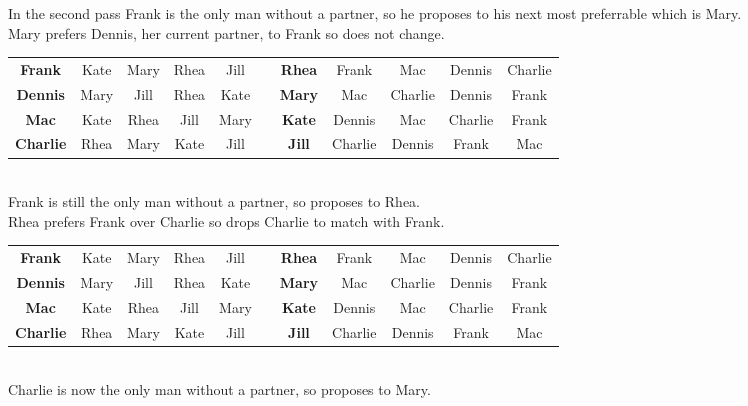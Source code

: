 \documentclass[11pt,a4paper]{article}
\begin{document}
In the second pass Frank is the only man without a partner, so he proposes to his next most preferrable which is Mary.\\
Mary prefers Dennis, her current partner, to Frank so does not change.\\
\begin{tabular}{|c|cccc|c|c|cccc|}
  \cline{1-5} \cline{7-11}
  \textbf{Frank} & \cellcolor{red!25}Kate & \cellcolor{red!25}Mary & Rhea & Jill & \quad &\textbf{Rhea} & Frank & Mac & Dennis & \cellcolor{green!25} Charlie\\
  \textbf{Dennis} & \cellcolor{green!25} Mary & Jill & Rhea & Kate & \quad & \textbf{Mary} & Mac & Charlie & \cellcolor{green!25} Dennis & \cellcolor{red!25}Frank\\
  \textbf{Mac} & \cellcolor{green!25} Kate & Rhea & Jill & Mary & \quad & \textbf{Kate} & Dennis & \cellcolor{green!25} Mac & Charlie & \cellcolor{red!25} Frank\\
  \textbf{Charlie} & \cellcolor{green!25} Rhea & Mary & Kate & Jill & \quad & \textbf{Jill} & Charlie & Dennis & Frank & Mac\\
  \cline{1-5} \cline{7-11}
\end{tabular}\\
Frank is still the only man without a partner, so proposes to Rhea.\\
Rhea prefers Frank over Charlie so drops Charlie to match with Frank.\\
\begin{tabular}{|c|cccc|c|c|cccc|}
  \cline{1-5} \cline{7-11}
  \textbf{Frank} & \cellcolor{red!25}Kate & \cellcolor{red!25}Mary & \cellcolor{green!25}Rhea & Jill & \quad &\textbf{Rhea} & \cellcolor{green!25}Frank & Mac & Dennis & \cellcolor{red!25} Charlie\\
  \textbf{Dennis} & \cellcolor{green!25} Mary & Jill & Rhea & Kate & \quad & \textbf{Mary} & Mac & Charlie & \cellcolor{green!25} Dennis & \cellcolor{red!25}Frank\\
  \textbf{Mac} & \cellcolor{green!25} Kate & Rhea & Jill & Mary & \quad & \textbf{Kate} & Dennis & \cellcolor{green!25} Mac & Charlie & \cellcolor{red!25} Frank\\
  \textbf{Charlie} & \cellcolor{red!25} Rhea & Mary & Kate & Jill & \quad & \textbf{Jill} & Charlie & Dennis & Frank & Mac\\
  \cline{1-5} \cline{7-11}
\end{tabular}\\
Charlie is now the only man without a partner, so proposes to Mary.
\end{document}
